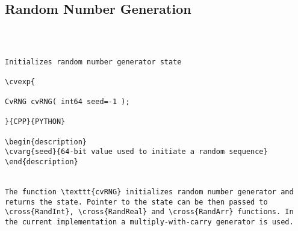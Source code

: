 \subsection{Random Number Generation}
\begin{verbatim}


\end{verbatim}
\begin{verbatim}

Initializes random number generator state

\cvexp{

CvRNG cvRNG( int64 seed=-1 );

}{CPP}{PYTHON}

\begin{description}
\cvarg{seed}{64-bit value used to initiate a random sequence}
\end{description}


The function \texttt{cvRNG} initializes random number generator and returns the state. Pointer to the state can be then passed to \cross{RandInt}, \cross{RandReal} and \cross{RandArr} functions. In the current implementation a multiply-with-carry generator is used.


\end{verbatim}
